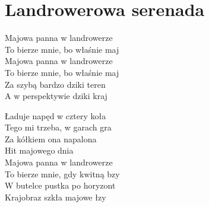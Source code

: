 \section{Landrowerowa serenada}
\begin{text}
Majowa panna w landrowerze\\
To bierze mnie, bo właśnie maj\\
Majowa panna w landrowerze\\
To bierze mnie, bo właśnie maj\\
Za szybą bardzo dziki teren\\
A w perspektywie dziki kraj

Ładuje napęd w cztery koła\\
Tego mi trzeba, w garach gra\\
Za kółkiem ona napalona\\
Hit majowego dnia\\
Majowa panna w landrowerze\\
To bierze mnie, gdy kwitną bzy\\
W butelce pustka po horyzont\\
Krajobraz szkła majowe łzy
\end{text}
